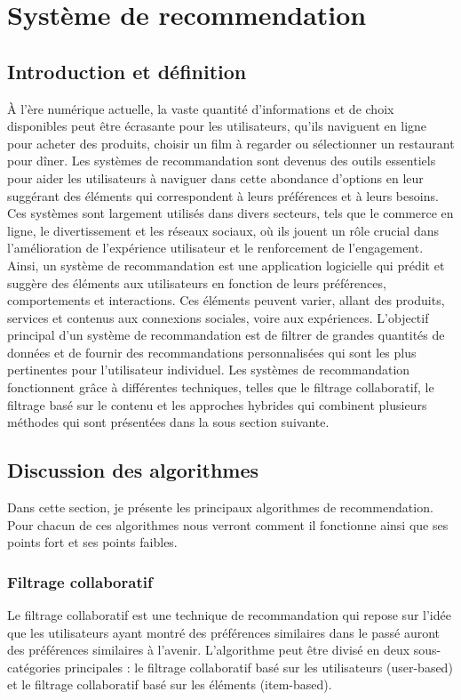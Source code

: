 \documentclass[11pt]{article}
\begin{document}
\newpage

\section{Système de recommendation}
\subsection{Introduction et définition}
À l'ère numérique actuelle, la vaste quantité d'informations et de choix disponibles peut être écrasante pour les utilisateurs, qu'ils naviguent en ligne pour acheter des produits, choisir un film à regarder ou sélectionner un restaurant pour dîner. Les systèmes de recommandation sont devenus des outils essentiels pour aider les utilisateurs à naviguer dans cette abondance d'options en leur suggérant des éléments qui correspondent à leurs préférences et à leurs besoins. Ces systèmes sont largement utilisés dans divers secteurs, tels que le commerce en ligne, le divertissement et les réseaux sociaux, où ils jouent un rôle crucial dans l'amélioration de l'expérience utilisateur et le renforcement de l'engagement.\\

Ainsi, un système de recommandation est une application logicielle qui prédit et suggère des éléments aux utilisateurs en fonction de leurs préférences, comportements et interactions. Ces éléments peuvent varier, allant des produits, services et contenus aux connexions sociales, voire aux expériences. L'objectif principal d'un système de recommandation est de filtrer de grandes quantités de données et de fournir des recommandations personnalisées qui sont les plus pertinentes pour l'utilisateur individuel.
Les systèmes de recommandation fonctionnent grâce à différentes techniques, telles que le filtrage collaboratif, le filtrage basé sur le contenu et les approches hybrides qui combinent plusieurs méthodes qui sont présentées dans la sous section suivante.


\subsection{Discussion des algorithmes}
\label{2.2}
Dans cette section, je présente les principaux algorithmes de recommendation. Pour chacun de ces algorithmes nous verront comment il fonctionne ainsi que ses points fort et ses points faibles.
\subsubsection{Filtrage collaboratif}
Le filtrage collaboratif est une technique de recommandation qui repose sur l'idée que les utilisateurs ayant montré des préférences similaires dans le passé auront des préférences similaires à l'avenir. L'algorithme peut être divisé en deux sous-catégories principales : le filtrage collaboratif basé sur les utilisateurs (user-based) et le filtrage collaboratif basé sur les éléments (item-based).\\
\end{document}
